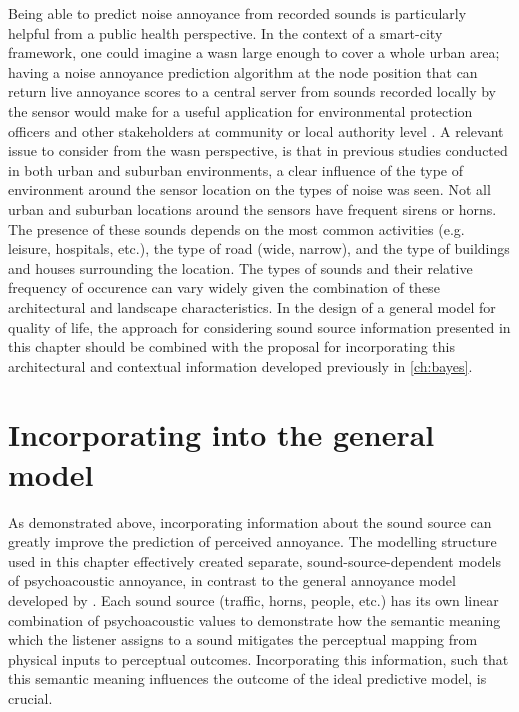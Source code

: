 Being able to predict noise annoyance from recorded sounds is particularly helpful from a public health perspective. In the context of a smart-city framework, one could imagine a \gls{wasn} large enough to cover a whole urban area; having a noise annoyance prediction algorithm at the node position that can return live annoyance scores to a central server from sounds recorded locally by the sensor would make for a useful application for environmental protection officers and other stakeholders at community or local authority level \citep{Kang2018Impact}. A relevant issue to consider from the \gls{wasn} perspective, is that in previous studies conducted in both urban \citep{Alias2020WASN} and suburban \citep{Alias2020Aggregate} environments, a clear influence of the type of environment around the sensor location on the types of noise was seen. Not all urban and suburban locations around the sensors have frequent sirens or horns. The presence of these sounds depends on the most common activities (e.g. leisure, hospitals, etc.), the type of road (wide, narrow), and the type of buildings and houses surrounding the location. The types of sounds and their relative frequency of occurence can vary widely given the combination of these architectural and landscape characteristics. In the design of a general model for quality of life, the approach for considering sound source information presented in this chapter should be combined with the proposal for incorporating this architectural and contextual information developed previously in \cref{ch:bayes}.

\section{Incorporating into the general model}
\label{sec:soundSourceIncorporation}
As demonstrated above, incorporating information about the sound source can greatly improve the prediction of perceived annoyance. The modelling structure used in this chapter effectively created separate, sound-source-dependent models of psychoacoustic annoyance, in contrast to the general annoyance model developed by \citet{PsychoacousticsfactsmodelsZwicker}. Each sound source (traffic, horns, people, etc.) has its own linear combination of psychoacoustic values to demonstrate how the semantic meaning which the listener assigns to a sound mitigates the perceptual mapping from physical inputs to perceptual outcomes. Incorporating this information, such that this semantic meaning influences the outcome of the ideal predictive model, is crucial. 

